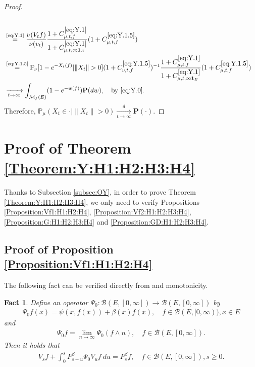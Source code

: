 \documentclass[12pt,a4paper]{amsart}
\numberwithin{equation}{section}
\theoremstyle{plain}
\newtheorem{fact}[thm]{Fact}
\theoremstyle{definition}
\theoremstyle{remark}
\newcounter{N}
\newcounter{n}[N]
\begin{document}
\begin{proof}
\begin{align}
 \\& \overset{\text{\eqref{eq:Y.1}}}= \frac{ \nu(V_tf) }{ \nu(v_t) } \frac{1+C^{\eqref{eq:Y.1}}_{\mu,t,f}}{1+C^{\eqref{eq:Y.1}}_{\mu, t,\infty \mathbf 1_E}}(1+ C^{\eqref{eq:Y.1.5}}_{\mu,t,f})
 	\\& \overset{\text{\eqref{eq:Y.1.5}}}= \mathbb P_\nu [1 - e^{-X_t(f)}|\|X_t\|>0](1+C^{\eqref{eq:Y.1.5}}_{\nu, t,f})^{-1}  \frac{1+C^{\eqref{eq:Y.1}}_{\mu,t,f}}{1+C^{\eqref{eq:Y.1}}_{\mu,  t,\infty \mathbf 1_E}}(1+ C^{\eqref{eq:Y.1.5}}_{\mu,t,f})
 	\\&\xrightarrow[t\to \infty]{} \int_{\mathcal M_f(E)}(1-e^{-w(f)}) \mathbf P(dw), \quad \text{by \eqref{eq:Y.0}}.
\end{align}
	Therefore, $\mathbb P_\mu(X_t \in \cdot | \|X_t\|>0) \xrightarrow[t\to \infty]{d} \mathbf P(\cdot).$
\end{proof}

\section{Proof of Theorem \ref{Theorem:Y:H1:H2:H3:H4}}
	Thanks to Subsection \ref{subsec:OY}, in order to prove Theorem \ref{Theorem:Y:H1:H2:H3:H4}, we only need to verify Propositions \ref{Proposition:Vf1:H1:H2:H4}, \ref{Proposition:Vf2:H1:H2:H3:H4}, \ref{Proposition:G:H1:H2:H3:H4} and \ref{Proposition:GD:H1:H2:H3:H4}.
\subsection{Proof of Proposition \ref{Proposition:Vf1:H1:H2:H4}} \label{sec:Vf1}

	The following fact can be verified directly from \cite[Theorem 2.23]{Li2011MeasureValued} and monotonicity.
\begin{fact} \label{Fact:P!}
Define an operator $\Psi_0: \mathcal B(E, [0,\infty]) \to \mathcal B(E,[0,\infty])$ by
\begin{align}
 	\Psi_0 f(x)
 	= \psi(x,f(x))+\beta(x)f(x),
 	\quad f\in \mathcal B(E,[0,\infty)), x\in E
\end{align}
	and
\begin{align}
	\Psi_0 f
 	= \lim_{n\to \infty} \Psi_0 (f\wedge n), \quad f\in \mathcal B(E,[0,\infty]).
\end{align}
	Then it holds that
\begin{align}\label{e:cum-FK}
 V_s f + \int_0^s P_{s-u}^\beta \Psi_0 V_{u} f ~du
 = P_s^\beta f,
 \quad f\in \mathcal B(E,[0,\infty]), s\geq 0.
 \end{align}
\end{fact}
\end{document}
